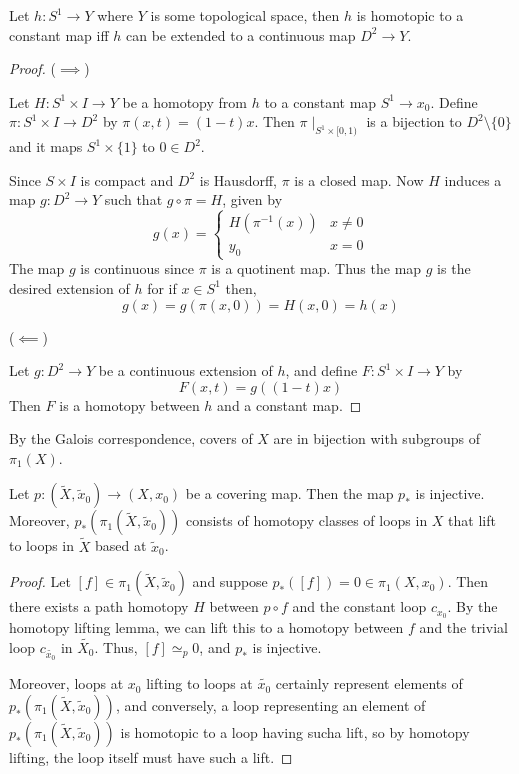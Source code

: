 \documentclass[12pt]{amsart}
\begin{document}
\begin{proposition}
    Let $h: S^1 \to Y$ where $Y$ is some topological space, then $h$ is homotopic to a constant map iff $h$ can be extended to a continuous map $D^2 \to Y$. 
\end{proposition} 
\begin{proof}
    ($\implies$)

    Let $H: S^1 \times I \to Y$ be a homotopy from $h$ to a constant map $S^1 \to x_0$. Define $\pi: S^1 \times I \to D^2$ by $\pi(x,t) = (1-t)x$. Then $\pi\mid_{S^1 \times [0,1)}$ is a bijection to $D^2 \setminus \{0\}$ and it maps $S^1 \times \{1\}$ to $0 \in D^2$. 
    
    Since $S \times I $ is compact and $D^2$ is Hausdorff, $\pi$ is a closed map. Now $H$ induces a map $g: D^2 \to Y$ such that $g \circ \pi = H$, given by 
    \[g(x) = \begin{cases}
        H(\pi^{-1}(x)) & x \neq 0 \\ 
        y_0 & x = 0
    \end{cases}\]
    The map $g$ is continuous since $\pi$ is a quotinent map. Thus the map $g$ is the desired extension of $h$ for if $x \in S^1$ then, 
    \[g(x) = g(\pi(x,0)) = H(x,0) = h(x)\]

    ($\impliedby$)

    Let $g: D^2 \to Y$ be a continuous extension of $h$, and define $F: S^1 \times I \to Y$ by 
    \[F(x,t) = g((1-t)x)\]
    Then $F$ is a homotopy between $h$ and a constant map.  
\end{proof}

\begin{remark}
    By the Galois correspondence, covers of $X$ are in bijection with subgroups of $\pi_1(X)$. 
\end{remark}

\begin{proposition}
    Let $p: (\widetilde{X}, \widetilde{x}_0) \to (X, x_0)$ be a covering map. Then the map $p_*$ is injective. Moreover, $p_*(\pi_1(\widetilde{X}, \widetilde{x}_0))$ consists of homotopy classes of loops in $X$ that lift to loops in $\widetilde{X}$ based at $\widetilde{x}_0$.
\end{proposition}

\begin{proof}
    Let $[f] \in \pi_1(\widetilde{X}, \widetilde{x}_0)$ and suppose $p_*([f]) = 0 \in \pi_1(X, x_0)$. Then there exists a path homotopy $H$ between $p \circ f$ and the constant loop $c_{x_0}$. By the homotopy lifting lemma, we can lift this to a homotopy between $f$ and the trivial loop $c_{\widetilde{x_0}}$ in $\widetilde{X_0}$. Thus, $[f] \simeq_p 0$, and $p_{*}$ is injective. 
    
    Moreover, loops at $x_0$ lifting to loops at $\widetilde{x_0}$ certainly represent elements of $p_*(\pi_1(\widetilde{X}, \widetilde{x}_0))$, and conversely, a loop representing an element of $p_*(\pi_1(\widetilde{X}, \widetilde{x}_0))$ is homotopic to a loop having sucha lift, so by homotopy lifting, the loop itself must have such a lift. 
\end{proof}
\end{document}
